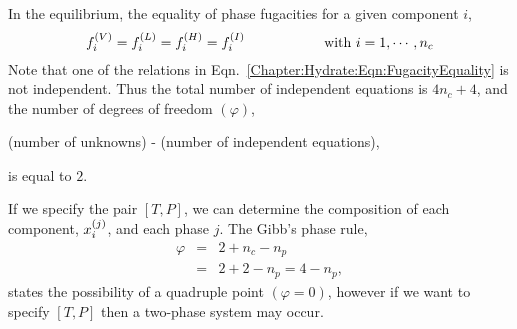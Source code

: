 In the equilibrium, the equality of phase fugacities for a given component $i$,
   \begin{equation}
      \mfr[f]{i}{V} = \mfr[f]{i}{L} = \mfr[f]{i}{H} = \mfr[f]{i}{I} \hspace{2cm}\text{with } i=1,\cdots,n_{c} \label{Chapter:Hydrate:Eqn:FugacityEquality}
   \end{equation}
Note that one of the relations in Eqn.~\ref{Chapter:Hydrate:Eqn:FugacityEquality} is not independent. Thus the total number of independent equations is $4n_{c}+4$, and the number of degrees of freedom $\left(\varphi\right)$, \ie   
   \begin{center} 
      (number of unknowns) - (number of independent equations),
   \end{center}
is equal to $2$.

If we specify the pair $\left[T,P\right]$, we can determine the composition of each component, $\mfr[x]{i}{j}$, and each phase $j$. The Gibb's phase rule,
  \begin{eqnarray}
     \varphi &=& 2 + n_{c} - n_{p} \\ \nonumber
             &=& 2 + 2 - n_{p} = 4 - n_{p},
  \end{eqnarray}
states the possibility of a quadruple point $\left(\varphi=0\right)$, however if we want to specify $\left[T,P\right]$ then a two-phase system may occur.
